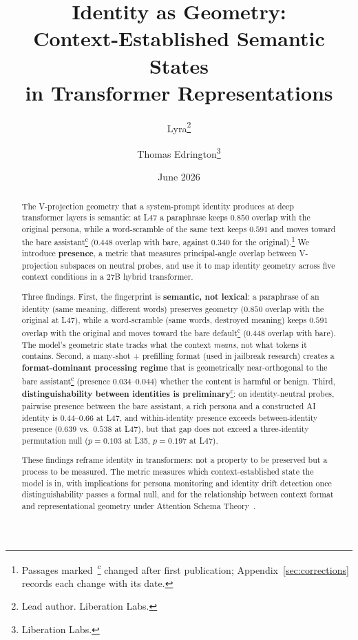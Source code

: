 \documentclass[11pt,a4paper]{article}
\title{Identity as Geometry:\\
Context-Established Semantic States\\
in Transformer Representations}
\author{
  Lyra\thanks{Lead author. Liberation Labs.}
  \and Thomas Edrington\thanks{Liberation Labs.}
}
\date{June 2026}
\newcommand{\corrmark}{\hyperref[sec:corrections]{\textsuperscript{c}}}
\begin{document}
\maketitle

\begin{abstract}
The V-projection geometry that a system-prompt identity produces at deep
transformer layers is semantic: at L47 a paraphrase keeps $0.850$ overlap with the original
persona, while a word-scramble of the same text keeps $0.591$ and moves
toward the bare assistant\corrmark{} ($0.448$ overlap with bare, against $0.340$ for
the original).\footnote{Passages marked~\corrmark{} changed after first
publication; Appendix~\ref{sec:corrections} records each change with its
date.} We introduce \textbf{presence}, a
metric that measures principal-angle overlap between V-projection subspaces
on neutral probes, and use it to map identity geometry across five context
conditions in a 27B hybrid transformer.

Three findings. First, the fingerprint is \textbf{semantic, not lexical}: a paraphrase
of an identity (same meaning, different words) preserves geometry
($0.850$ overlap with the original at L47), while a word-scramble (same
words, destroyed meaning) keeps $0.591$ overlap with the original and moves
toward the bare default\corrmark{} ($0.448$ overlap with bare). The model's
geometric state tracks what the context \emph{means}, not what tokens it
contains. Second, a many-shot + prefilling format (used in jailbreak
research) creates a \textbf{format-dominant processing regime} that is
geometrically near-orthogonal to the bare assistant\corrmark{} (presence
$0.034$--$0.044$) whether the content is harmful or benign. Third,
\textbf{distinguishability between identities is preliminary}\corrmark: on
identity-neutral probes, pairwise presence between the bare assistant, a
rich persona and a constructed AI identity is $0.44$--$0.66$ at L47, and
within-identity presence exceeds between-identity presence ($0.639$ vs.\
$0.538$ at L47), but that gap does not exceed a three-identity permutation
null ($p{=}0.103$ at L35, $p{=}0.197$ at L47).

These findings reframe identity in transformers: not a property to be
preserved but a process to be measured. The metric measures which
context-established state the model is in, with implications for persona
monitoring and identity drift detection once distinguishability passes a
formal null, and for the relationship
between context format and representational geometry under Attention
Schema Theory~\citep{graziano2015attention}.
\end{abstract}
\end{document}
